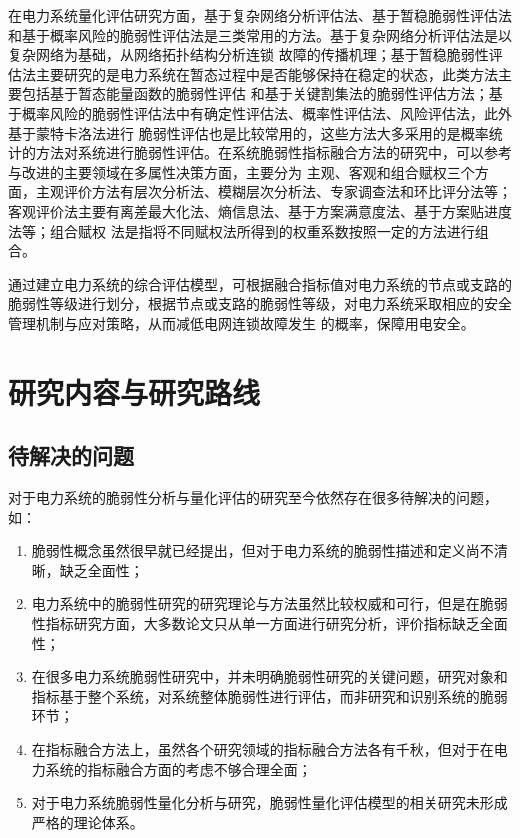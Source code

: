 在电力系统量化评估研究方面，基于复杂网络分析评估法、基于暂稳脆弱性评估法和基于概率风险的脆弱性评估法是三类常用的方法。基于复杂网络分析评估法是以复杂网络为基础，从网络拓扑结构分析连锁
故障的传播机理\cite{refs50,refs51,refs52}；基于暂稳脆弱性评估法主要研究的是电力系统在暂态过程中是否能够保持在稳定的状态，此类方法主要包括基于暂态能量函数的脆弱性评估\cite{refs53}
和基于关键割集法的脆弱性评估方法\cite{refs54}；基于概率风险的脆弱性评估法中有确定性评估法\cite{refs55}、概率性评估法\cite{refs56}、风险评估法\cite{refs57}，此外基于蒙特卡洛法进行
脆弱性评估\cite{refs58}也是比较常用的，这些方法大多采用的是概率统计的方法对系统进行脆弱性评估。在系统脆弱性指标融合方法的研究中，可以参考与改进的主要领域在多属性决策方面，主要分为
主观、客观和组合赋权三个方面，主观评价方法有层次分析法、模糊层次分析法、专家调查法和环比评分法等；客观评价法主要有离差最大化法、熵信息法、基于方案满意度法、基于方案贴进度法等；组合赋权
法是指将不同赋权法所得到的权重系数按照一定的方法进行组合\cite{refs59}。

通过建立电力系统的综合评估模型，可根据融合指标值对电力系统的节点或支路的脆弱性等级进行划分，根据节点或支路的脆弱性等级，对电力系统采取相应的安全管理机制与应对策略，从而减低电网连锁故障发生
的概率，保障用电安全。



\section{研究内容与研究路线}
\label{sec:research_curise}

\subsection{待解决的问题}
\label{sec:research_problem}
对于电力系统的脆弱性分析与量化评估的研究至今依然存在很多待解决的问题，如：
\begin{enumerate}[(1)]
  \item 脆弱性概念虽然很早就已经提出，但对于电力系统的脆弱性描述和定义尚不清晰，缺乏全面性；
  \item 电力系统中的脆弱性研究的研究理论与方法虽然比较权威和可行，但是在脆弱性指标研究方面，大多数论文只从单一方面进行研究分析，评价指标缺乏全面性；
  \item 在很多电力系统脆弱性研究中，并未明确脆弱性研究的关键问题，研究对象和指标基于整个系统，对系统整体脆弱性进行评估，而非研究和识别系统的脆弱环节；
  \item 在指标融合方法上，虽然各个研究领域的指标融合方法各有千秋，但对于在电力系统的指标融合方面的考虑不够合理全面；
  \item 对于电力系统脆弱性量化分析与研究，脆弱性量化评估模型的相关研究未形成严格的理论体系。
 \end{enumerate}

